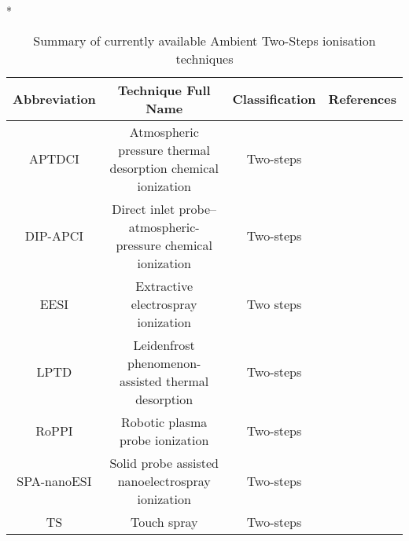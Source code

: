 \begin{table}{*}
\caption{Summary of currently available Ambient Two-Steps ionisation techniques}
\label{table:Ambient_TwoSteps}

\centering 
\scriptsize

    \begin{tabular}{|c|c|c|l|}
        \hline
        \textbf{Abbreviation}  & \textbf{Technique Full Name} & \textbf{Classification} & \textbf{References} \\ 
        \hline \hline 
        APTDCI & Atmospheric pressure thermal desorption chemical ionization & Two-steps & \cite{21683155} \\
        DIP-APCI & Direct inlet probe–atmospheric-pressure chemical ionization & Two-steps & \cite{23912829} \\
        EESI & Extractive electrospray ionization & Two steps & \cite{16767269} \\
        LPTD & Leidenfrost phenomenon-assisted thermal desorption & Two-steps & \cite{23423791} \\
        RoPPI & Robotic plasma probe ionization & Two-steps & \cite{24603806} \\
        SPA-nanoESI & Solid probe assisted nanoelectrospray ionization & Two-steps & \cite{22937532} \\
        TS & Touch spray & Two-steps & \cite{24756256} \\
        \hline \hline 
    \end{tabular}
\end{table}
